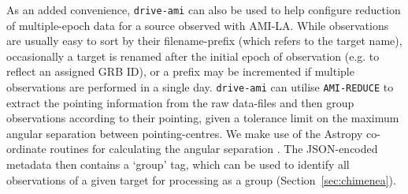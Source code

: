 \documentclass[5p,authoryear]{elsarticle}
\begin{document}
As an added convenience, \texttt{drive-ami} can also be used to help configure reduction of multiple-epoch data for a source observed with AMI-LA. 
While observations are usually easy to sort by their filename-prefix (which refers to the target name), occasionally a target is renamed after the initial epoch of observation (e.g. to reflect an assigned GRB ID), or a prefix may be incremented if multiple observations are performed in a single day. 
\texttt{drive-ami} can utilise \texttt{AMI-REDUCE} to extract the pointing information from the raw data-files and then group observations according to their pointing, given a tolerance limit on the maximum angular separation between pointing-centres. 
We make use of the Astropy co-ordinate routines for calculating the angular separation \citep{Astropy2013}.
The JSON-encoded metadata then contains a `group' tag, which can be used to identify all observations of a given target for processing as a group (Section~\ref{sec:chimenea}).
\end{document}
